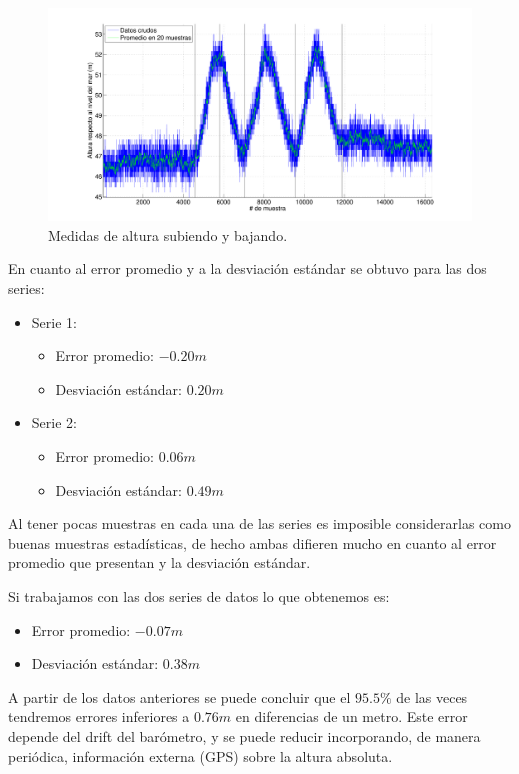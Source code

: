 \documentclass[spanish,12pt,a4paper,titlepage]{report}
\begin{document}
\begin{figure}[H]
\centering
  \includegraphics[width=1\textwidth]{./pics/variando.pdf}
  \caption{Medidas de altura subiendo y bajando.}
  \label{fig:variando}
\end{figure}

En cuanto al error promedio y a la desviación estándar se obtuvo para las dos series:

\begin{itemize}
\item Serie 1:
		\begin{itemize}
		\item Error promedio: $-0.20m$
		\item Desviación estándar: $0.20m$
		\end{itemize}
\item Serie 2:
		\begin{itemize}
		\item Error promedio: $0.06m$
		\item Desviación estándar: $0.49m$
		\end{itemize}
\end{itemize}

Al tener pocas muestras en cada una de las series es imposible considerarlas como buenas muestras estadísticas, de hecho ambas difieren mucho en cuanto al error promedio que presentan y la desviación estándar. 

Si trabajamos con las dos series de datos lo que obtenemos es:

\begin{itemize}
\item Error promedio: $-0.07m$
\item Desviación estándar: $0.38m$
\end{itemize}



A partir de los datos anteriores se puede concluir que el $95.5 \%$ de las veces tendremos errores inferiores a $0.76m$ en diferencias de un metro. Este error depende del drift del barómetro, y se puede reducir incorporando, de manera periódica, información externa (GPS) sobre la altura absoluta.
\end{document}
